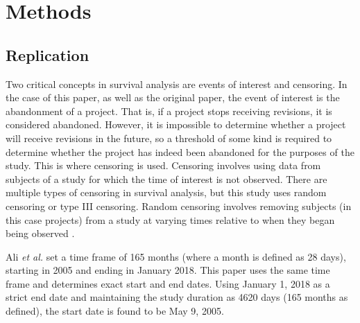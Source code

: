 \documentclass[acmconf]{acmart}
\begin{document}

\section{Methods} \label{methods}

\subsection{Replication}

Two critical concepts in survival analysis are events of interest and censoring.
In the case of this paper, as well as the original paper, the event of interest is the abandonment of a project.
That is, if a project stops receiving revisions, it is considered abandoned.
However, it is impossible to determine whether a project will receive revisions in the future, so a threshold of some kind is required to determine whether the project has indeed been abandoned for the purposes of the study.
This is where censoring is used.
Censoring involves using data from subjects of a study for which the time of interest is not observed.
There are multiple types of censoring in survival analysis, but this study uses random censoring or type III censoring.  
Random censoring involves removing subjects (in this case projects) from a study at varying times relative to when they began being observed \cite{renganathan2016overview}. 

Ali \emph{et al.} set a time frame of 165 months (where a month is defined as 28 days), starting in 2005 and ending in January 2018.
This paper uses the same time frame and determines exact start and end dates.
Using January 1, 2018 as a strict end date and maintaining the study duration as 4620 days (165 months as defined), the start date is found to be May 9, 2005.
\end{document}
